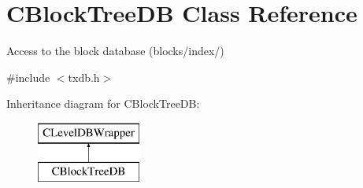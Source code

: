 \hypertarget{class_c_block_tree_d_b}{}\section{C\+Block\+Tree\+D\+B Class Reference}
\label{class_c_block_tree_d_b}


Access to the block database (blocks/index/)  




{\ttfamily \#include $<$txdb.\+h$>$}

Inheritance diagram for C\+Block\+Tree\+D\+B\+:\begin{figure}[H]
\begin{center}
\leavevmode
\includegraphics[height=2.000000cm]{class_c_block_tree_d_b}
\end{center}
\end{figure}
